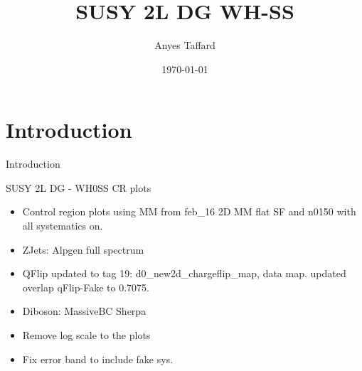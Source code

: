 \documentclass[10pt]{beamer}
\begin{document}

\newcommand{\METrel}{\ensuremath{E_\mathrm{T}^\mathrm{miss,rel}}}
\newcommand{\meff}{\ensuremath{m_{\mathrm{eff}}}}
\newcommand{\mt}{\ensuremath{m_\mathrm{T}}}
\newcommand{\pTmiss}{\ensuremath{\mathbf{p}_\mathrm{T}^\mathrm{miss}}}
\newcommand{\mll}{\ensuremath{m_{\ell\ell}}}
\newcommand{\pTll}{\ensuremath{p_\mathrm{T,\ell\ell}}}
\newcommand{\dphill}{\ensuremath{\Delta\phi_{\ell\ell}}}
\newcommand{\dRll}{\ensuremath{\Delta R_{\ell\ell}}}
\newcommand{\mjj}{\ensuremath{m_{jj}}}
\newcommand{\mljj}{\ensuremath{m_{ljj}}}


\author{Anyes Taffard}
\date{\today}

\title[SUSY 2L WH SS ]{SUSY 2L DG WH-SS}

\begin{frame}[plain]
  \titlepage
\end{frame}

\section{Introduction}
\begin{frame}{Introduction}
  \begin{block}{SUSY 2L DG - WH0SS CR plots }
    \begin{itemize}
    \item Control region plots using MM from feb\_16 2D MM flat SF and n0150 with all systematics on.
    \item ZJets: Alpgen full spectrum
    \item QFlip updated to tag 19: d0\_new2d\_chargeflip\_map, data map. updated overlap qFlip-Fake to 0.7075.
    \item Diboson: MassiveBC Sherpa
    \item Remove log scale to the plots
    \item Fix error band to include fake sys. 
    \end{itemize}
  \end{block}
\end{frame}
\end{document}
